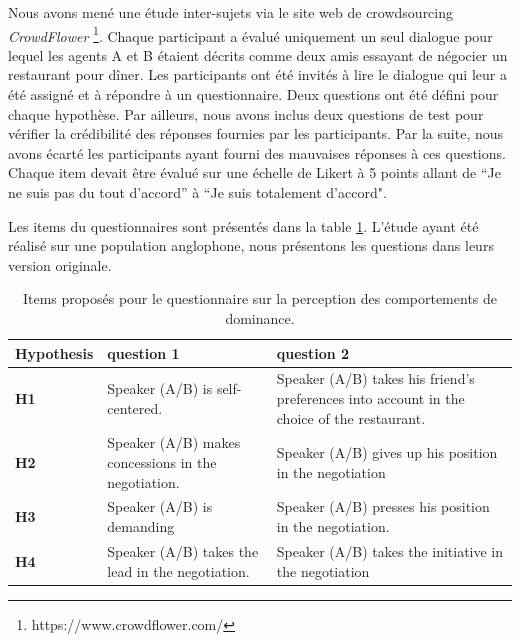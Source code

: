 {					Nous avons mené une étude inter-sujets via le site web de crowdsourcing  \emph {CrowdFlower} \footnote {https://www.crowdflower.com/}.
					Chaque participant a évalué uniquement un seul dialogue pour lequel les agents A et B étaient décrits comme deux amis essayant de négocier un restaurant pour dîner.
					Les participants ont été invités à lire le dialogue qui leur a été assigné et à répondre à un questionnaire.
					Deux questions ont été défini pour chaque hypothèse. Par ailleurs, nous avons inclus deux questions de test pour vérifier la crédibilité des réponses fournies par les participants. Par la suite, nous avons écarté les participants ayant fourni des mauvaises réponses à ces questions. 
					Chaque item devait être évalué sur une échelle de Likert à 5 points allant de ``Je ne suis pas du tout d'accord'' à ``Je suis totalement d'accord".
			
					Les items du questionnaires sont présentés dans la table \ref{table:questionnaire}. L'étude ayant été réalisé sur une population anglophone, nous présentons les questions dans leurs version originale. 
						
								\begin{table}[h]
																\centering
								\begin{tabular}{|p{1.75cm}|p{5cm}|p{5.5cm}|}

									\hline
									Hypothesis &question 1& question 2 \\
									\hline
									\textbf{H1} &Speaker (A/B) is self-centered. &Speaker (A/B) takes his friend's preferences into account in the choice of the restaurant.\\
									\hline
									\textbf{H2} &Speaker (A/B) makes concessions in the negotiation.&Speaker (A/B) gives up his position in the negotiation\\
									\hline
									\textbf{H3} & Speaker (A/B) is demanding&Speaker (A/B) presses his position in the negotiation. \\
									\hline
									\textbf{H4} &Speaker (A/B) takes the lead in the negotiation.&Speaker (A/B) takes the initiative in the negotiation \\
									\hline
								\end{tabular}
							
							\caption{Items proposés pour le questionnaire sur la perception des comportements de dominance.}
							\label{table:questionnaire}
						\end{table}
					
}
